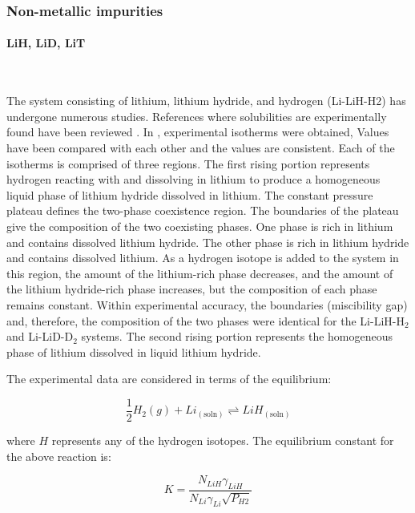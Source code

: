 \subsubsection{Non-metallic impurities}
\paragraph{LiH, LiD, LiT}~\\
\vspace{1mm} %

The system consisting of lithium, lithium hydride, and hydrogen (Li-LiH-H2) has undergone numerous studies. References where solubilities are experimentally found have been reviewed \cite{Veleckis1974THELH,Smith1979,Wang2012,Katsuta1977,Veleckis1977}. 
In \cite{Smith1979}, experimental isotherms were obtained, 
Values have been compared with each other and the values are consistent. 
Each of the isotherms is comprised of three regions. The first rising portion represents hydrogen reacting with and dissolving in lithium to produce a homogeneous 
liquid phase of lithium hydride dissolved in lithium. The constant pressure plateau defines the two-phase coexistence region. The boundaries of the plateau give the 
composition of the two coexisting phases. One phase is rich in lithium and contains dissolved lithium hydride. The other phase is rich in lithium hydride and contains 
dissolved lithium. As a hydrogen isotope is added to the system in this region, the amount of the lithium-rich phase decreases, and the amount of the lithium hydride-rich 
phase increases, but the composition of each phase remains constant. Within experimental accuracy, the boundaries (miscibility gap) and, therefore, the composition of the 
two phases were identical for the Li-LiH-H$_2$ and Li-LiD-D$_2$ systems. The second rising portion represents the homogeneous phase of lithium dissolved in liquid lithium hydride.


The experimental data are considered in terms of the equilibrium:

\begin{equation}
\frac{1}{2} H_2(g) + Li_{(\text{soln})} \rightleftharpoons LiH_{(\text{soln})}
\end{equation}

where $H$ represents any of the hydrogen isotopes. The equilibrium constant for the above reaction is:

\begin{equation}
K = \frac{N_{LiH} \gamma_{LiH}}{N_{Li} \gamma_{Li} \sqrt{P_{H2}}}
\label{eq:equilibrium_constant_h}
\end{equation}


